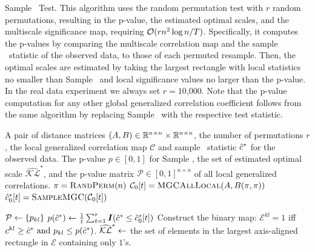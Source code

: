\documentclass[11pt]{extarticle}
\begin{document}
\clearpage

\begin{algorithm}
\caption{Sample \Mgc~Test.
This algorithm uses the random permutation test with $r$ random permutations, resulting in the p-value, the estimated optimal scales, and the multiscale significance map, requiring $\mathcal{O}(rn^2 \log n/T)$. Specifically, it computes the p-values by comparing the multiscale correlation map and the sample \Mgc~statistic of the observed data, to those of each permuted resample.  Then, the optimal scales are estimated by taking the largest rectangle with local statistics no smaller than Sample \Mgc~and local significance values no larger than the p-value.  In the real data experiment we always set $r=10$,$000$. Note that the p-value computation for any other global generalized correlation coefficient follows from the same algorithm by replacing Sample \Mgc~with the respective test statistic.
}
\label{alg:pval}
\begin{algorithmic}[1]
\Require A pair of distance matrices $(A, B) \in \mathbb{R}^{n \times n} \times \mathbb{R}^{n \times n}$, the number of permutations $r$, the local generalized correlation map $\mathcal{C}$ and sample \Mgc~statistic $\hat{c}^*$ for the observed data.
\Ensure The p-value $p \in [0,1]$ for Sample \Mgc, the set of estimated optimal scale $\widehat{\mathcal{KL}}^{*}$, and the p-value matrix $\mathcal{P} \in [0,1]^{n \times n}$ of all local generalized correlations.
\State $\pi=\textsc{RandPerm}(n)$ 
\State $\mathcal{C}_{0}[t]=\textsc{MGCAllLocal}(A, B(\pi,\pi))$ 
\State $\hat{c}^{*}_{0}[t]=\textsc{SampleMGC}(\mathcal{C}_{0}[t])$ 
\EndFor

  $\mathcal{P} \leftarrow \{ p_{kl} \}$
\State $p(\hat{c}^*) \leftarrow \frac{1}{t}\sum_{t=1}^{r}\boldsymbol{I}(\hat{c}^{*} \leq \hat{c}^{*}_{0}[t])$  
\State Construct the binary map:    $\mathcal{E}^{kl} = 1 $ iff $  c^{kl} \geq \hat{c}^{*} \mbox{ and } p_{kl} \leq p(\hat{c}^*)$.
\State $\widehat{\mathcal{KL}}^{*} \leftarrow $ the set of elements in the largest axis-aligned rectangle in $\mathcal{E}$ containing only $1$'s.

\EndFunction
\end{algorithmic}
\end{algorithm}
\end{document}
